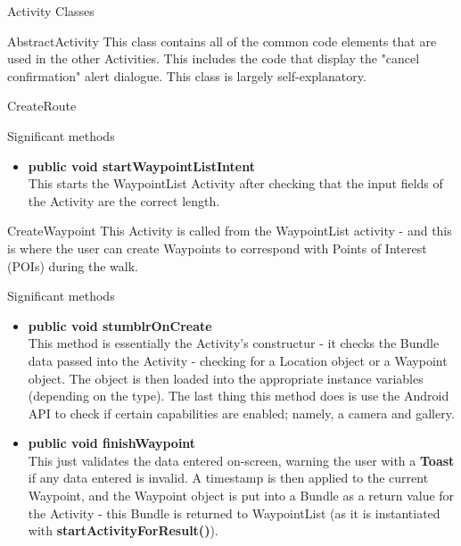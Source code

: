\documentclass{article}
\begin{document}
	\begin{section}{Activity Classes}
		\begin{subsection}{AbstractActivity}
			This class contains all of the common code elements that are used in the other Activities. This includes the code that display the "cancel confirmation" alert dialogue. This class is largely self-explanatory.
		\end{subsection}
		
		\begin{subsection}{CreateRoute}
			\begin{subsubsection}{Significant methods}
				\begin{itemize}
					\item{{\bf public void startWaypointListIntent} \\
					This starts the WaypointList Activity after checking that the input fields of the Activity are the correct length.}
				\end{itemize}
			\end{subsubsection}
		\end{subsection}
		
		\begin{subsection}{CreateWaypoint}
			This Activity is called from the WaypointList activity - and this is where the user can create Waypoints to correspond with Points of Interest (POIs) during the walk.
			\begin{subsubsection}{Significant methods}
				\begin{itemize}
					\item{{\bf public void stumblrOnCreate} \\
					This method is essentially the Activity's constructur - it checks the Bundle data passed into the Activity - checking for a Location object or a Waypoint object. The object is then loaded into the appropriate instance variables (depending on the type). The last thing this method does is use the Android API to check if certain capabilities are enabled; namely, a camera and gallery.}
					
					\item{{\bf public void finishWaypoint} \\
					This just validates the data entered on-screen, warning the user with a {\bf Toast} if any data entered is invalid. A timestamp is then applied to the current Waypoint, and the Waypoint object is put into a Bundle as a return value for the Activity - this Bundle is returned to WaypointList (as it is instantiated with {\bf startActivityForResult()}).}
					

\end{itemize}
\end{subsubsection}
\end{subsection}
\end{section}
\end{document}
